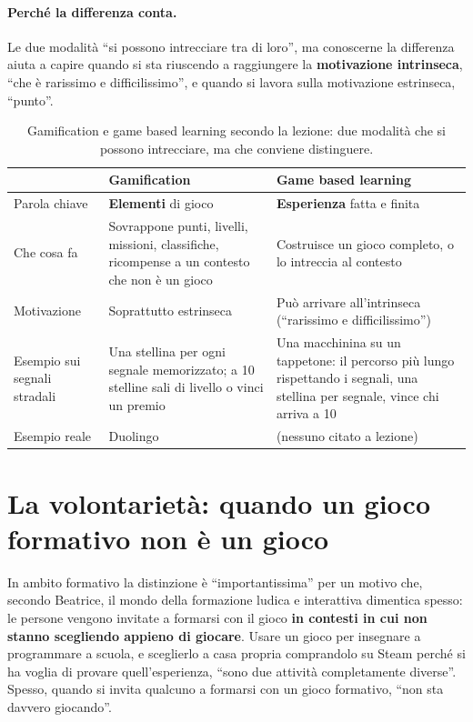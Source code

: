\paragraph{Perché la differenza conta.} Le due modalità ``si possono intrecciare tra
di loro'', ma conoscerne la differenza aiuta a capire quando si sta riuscendo a
raggiungere la \textbf{motivazione intrinseca}, ``che è rarissimo e
difficilissimo'', e quando si lavora sulla motivazione estrinseca, ``punto''.

\begin{table}[htbp]
\centering
\small
\begin{tabular}{@{}p{3cm}p{5.1cm}p{5.1cm}@{}}
\toprule
 & \textbf{Gamification} & \textbf{Game based learning} \\
\midrule
Parola chiave & \textbf{Elementi} di gioco & \textbf{Esperienza} fatta e finita \\
Che cosa fa & Sovrappone punti, livelli, missioni, classifiche, ricompense a un
  contesto che non è un gioco & Costruisce un gioco completo, o lo intreccia al
  contesto \\
Motivazione & Soprattutto estrinseca & Può arrivare all'intrinseca (``rarissimo e
  difficilissimo'') \\
Esempio sui segnali stradali & Una stellina per ogni segnale memorizzato; a 10
  stelline sali di livello o vinci un premio & Una macchinina su un tappetone: il
  percorso più lungo rispettando i segnali, una stellina per segnale, vince chi
  arriva a 10 \\
Esempio reale & Duolingo & (nessuno citato a lezione) \\
\bottomrule
\end{tabular}
\caption{Gamification e game based learning secondo la lezione: due modalità che si
possono intrecciare, ma che conviene distinguere.}
\label{a9:tab:gamification}
\end{table}

\section{La volontarietà: quando un gioco formativo non è un gioco}
\label{a9:sec:volontarieta}

In ambito formativo la distinzione è ``importantissima'' per un motivo che, secondo
Beatrice, il mondo della formazione ludica e interattiva dimentica spesso: le persone
vengono invitate a formarsi con il gioco \textbf{in contesti in cui non stanno
scegliendo appieno di giocare}. Usare un gioco per insegnare a programmare a scuola, e
sceglierlo a casa propria comprandolo su Steam perché si ha voglia di provare
quell'esperienza, ``sono due attività completamente diverse''. Spesso, quando si invita
qualcuno a formarsi con un gioco formativo, ``non sta davvero giocando''.


